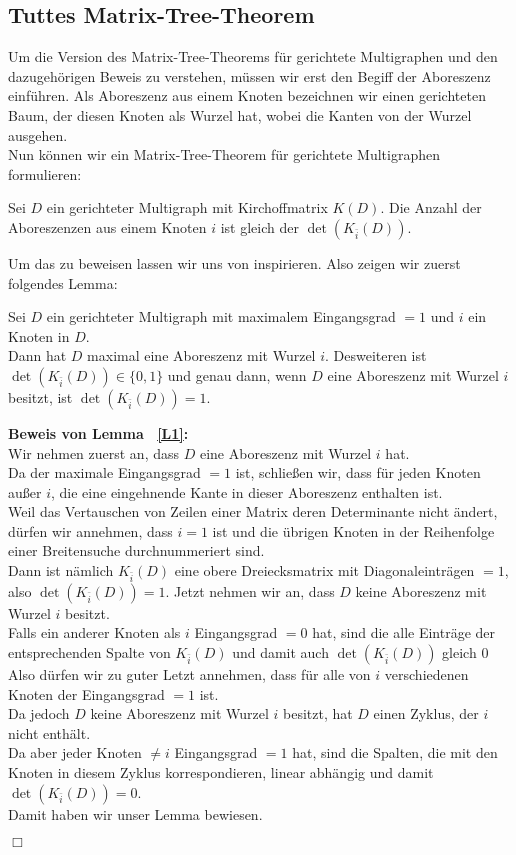 \subsection{Tuttes Matrix-Tree-Theorem}
Um die Version des Matrix-Tree-Theorems für gerichtete Multigraphen und den dazugehörigen Beweis zu verstehen, müssen wir erst den Begiff der Aboreszenz einführen.
Als Aboreszenz aus einem Knoten bezeichnen wir einen gerichteten Baum, der diesen Knoten als Wurzel hat, wobei die Kanten von der Wurzel ausgehen.\\
Nun können wir ein Matrix-Tree-Theorem für gerichtete Multigraphen formulieren:
\begin{Tms}
\sloppypar
Sei $D$ ein gerichteter Multigraph mit Kirchoffmatrix $K(D)$. Die Anzahl der Aboreszenzen aus einem Knoten $i$ ist gleich der $\det(K_{\bar{i}}(D))$.
\par
\end{Tms}
Um das zu beweisen lassen wir uns von \cite{bang-jensen_2009} inspirieren.
Also zeigen wir zuerst folgendes Lemma:
\begin{Lms}
Sei $D$ ein gerichteter Multigraph mit maximalem Eingangsgrad $=1$ und $i$ ein Knoten in $D$.\\
Dann hat $D$ maximal eine Aboreszenz mit Wurzel $i$. Desweiteren ist $\det(K_{\bar{i}}(D)) \in \{0,1\}$
und genau dann, wenn $D$ eine Aboreszenz mit Wurzel $i$ besitzt, ist $\det(K_{\bar{i}}(D)) = 1$.
\label{L1}
\end{Lms}
\textbf{Beweis von Lemma ~\ref{L1}:}\\
Wir nehmen zuerst an, dass $D$ eine Aboreszenz mit Wurzel $i$ hat.\\
Da der maximale Eingangsgrad $=1$ ist, schließen wir, dass für jeden Knoten außer $i$, die eine eingehnende Kante in dieser Aboreszenz enthalten ist. \\
Weil das Vertauschen von Zeilen einer Matrix deren Determinante nicht ändert, dürfen wir annehmen, dass $i=1$ ist und die übrigen Knoten in der Reihenfolge einer Breitensuche durchnummeriert sind.\\ 
Dann ist nämlich $K_{\bar{i}}(D)$ eine obere Dreiecksmatrix mit Diagonaleinträgen $=1$, also $\det(K_{\bar{i}}(D)) = 1$.
Jetzt nehmen wir an, dass $D$ keine Aboreszenz mit Wurzel $i$ besitzt.\\
Falls ein anderer Knoten als $i$ Eingangsgrad $=0$ hat, sind die alle Einträge der entsprechenden Spalte von $K_{\bar{i}}(D)$ und damit auch $\det(K_{\bar{i}}(D))$ gleich $0$\\
Also dürfen wir zu guter Letzt annehmen, dass für alle von $i$ verschiedenen Knoten der Eingangsgrad $=1$ ist.\\
Da jedoch $D$ keine Aboreszenz mit Wurzel $i$ besitzt, hat $D$ einen Zyklus, der $i$ nicht enthält.\\
Da aber jeder Knoten $\neq i$ Eingangsgrad $=1$ hat, sind die Spalten, die mit den Knoten in diesem Zyklus korrespondieren, linear abhängig und damit $\det(K_{\bar{i}}(D)) = 0$.\\
Damit haben wir unser Lemma bewiesen.
\begin{flushright} $\Box$ \end{flushright} 


